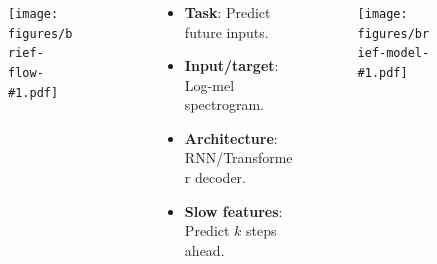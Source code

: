 { %


\newcommand{\presentationbriefslide}[3]{%
    \begin{frame}
        \frametitle{\vphantom{ABCDEFGHJIJKLMNOPQRSTVWXYZ}{#2}}
        \begin{columns}[t]
            \hspace{0.025\textwidth}
            \begin{column}{0.20\textwidth}
                \begin{figure}[\textwidth]
                    \centering
                    \texttt{[image: figures/brief-flow-\#1.pdf]}
                \end{figure}
            \end{column}
            {\textcolor{black!40}{\vrule{}}}
            \begin{column}{0.40\textwidth}
                {\vspace{0.10\textheight}\footnotesize#3}
            \end{column}
            \begin{column}{0.30\textwidth}
                \begin{figure}[\textwidth]
                    \centering
                    \texttt{[image: figures/brief-model-\#1.pdf]}
                \end{figure}
            \end{column}
            \hspace{0.020\textwidth}
        \end{columns}
    \end{frame}
}


\presentationbriefslide{1}{Autoregressive Predictive Coding (APC)}{%
    \begin{itemize}
        \item {\bfseries \color{black} Task}: Predict future inputs.
        \item {\bfseries \color{black} Input/target}: Log-mel spectrogram.
        \item {\bfseries \color{black} Architecture}: RNN/Transformer decoder.
        \item {\bfseries \color{black} Slow features}: Predict $k$ steps ahead.
    \end{itemize}
}

}
